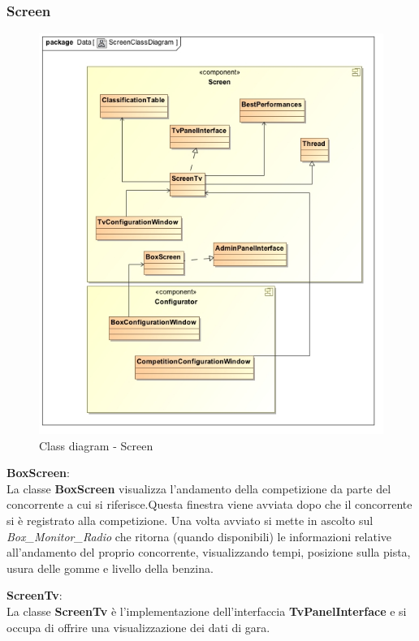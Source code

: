 \subsubsection{Screen}
\begin{center}
\begin{figure}[h!]
	\includegraphics[scale=0.50]{img/ClassDiagrams/ScreenClassDiagram.jpg}
\caption{Class diagram - Screen}
\end{figure}
\begin{description}
\item{\textbf{BoxScreen}}:\\
La classe \textbf{BoxScreen} visualizza l'andamento della competizione da parte del concorrente a cui si riferisce.Questa finestra viene avviata dopo che il concorrente si \`{e} registrato alla competizione. Una volta avviato si mette in ascolto sul \emph{Box\_Monitor\_Radio} che ritorna (quando disponibili) le informazioni relative all'andamento del proprio concorrente, visualizzando tempi, posizione sulla pista, usura delle gomme e livello della benzina.
\item{\textbf{ScreenTv}}:\\
La classe \textbf{ScreenTv} \`{e} l'implementazione dell'interfaccia \textbf{TvPanelInterface} e si occupa di offrire una visualizzazione dei dati di gara.

\end{description}
\end{center}
